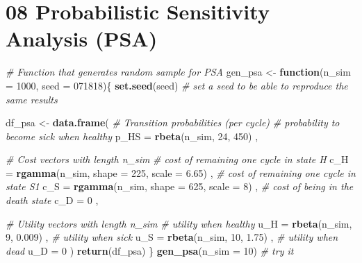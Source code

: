 \documentclass[
]{article}
\newenvironment{Shaded}{\begin{snugshade}}{\end{snugshade}}
\newcommand{\CommentTok}[1]{\textcolor[rgb]{0.56,0.35,0.01}{\textit{#1}}}
\newcommand{\ControlFlowTok}[1]{\textcolor[rgb]{0.13,0.29,0.53}{\textbf{#1}}}
\newcommand{\DataTypeTok}[1]{\textcolor[rgb]{0.13,0.29,0.53}{#1}}
\newcommand{\DecValTok}[1]{\textcolor[rgb]{0.00,0.00,0.81}{#1}}
\newcommand{\FloatTok}[1]{\textcolor[rgb]{0.00,0.00,0.81}{#1}}
\newcommand{\KeywordTok}[1]{\textcolor[rgb]{0.13,0.29,0.53}{\textbf{#1}}}
\newcommand{\NormalTok}[1]{#1}
\newcommand{\StringTok}[1]{\textcolor[rgb]{0.31,0.60,0.02}{#1}}
\begin{document}
\hypertarget{probabilistic-sensitivity-analysis-psa}{%
\section{08 Probabilistic Sensitivity Analysis
(PSA)}\label{probabilistic-sensitivity-analysis-psa}}

\begin{Shaded}
\begin{Highlighting}[]
\CommentTok{# Function that generates random sample for PSA}
\NormalTok{gen_psa <-}\StringTok{ }\ControlFlowTok{function}\NormalTok{(}\DataTypeTok{n_sim =} \DecValTok{1000}\NormalTok{, }\DataTypeTok{seed =} \DecValTok{071818}\NormalTok{)\{}
  \KeywordTok{set.seed}\NormalTok{(seed) }\CommentTok{# set a seed to be able to reproduce the same results}
  
\NormalTok{  df_psa <-}\StringTok{ }\KeywordTok{data.frame}\NormalTok{(}
    \CommentTok{# Transition probabilities (per cycle)}
    \CommentTok{# probability to become sick when healthy}
    \DataTypeTok{p_HS    =} \KeywordTok{rbeta}\NormalTok{(n_sim, }\DecValTok{24}\NormalTok{, }\DecValTok{450}\NormalTok{)                        , }
    
    \CommentTok{# Cost vectors with length n_sim}
    \CommentTok{# cost of remaining one cycle in state H}
    \DataTypeTok{c_H     =} \KeywordTok{rgamma}\NormalTok{(n_sim, }\DataTypeTok{shape =} \DecValTok{225}\NormalTok{, }\DataTypeTok{scale =} \FloatTok{6.65}\NormalTok{)     , }
    \CommentTok{# cost of remaining one cycle in state S1}
    \DataTypeTok{c_S     =} \KeywordTok{rgamma}\NormalTok{(n_sim, }\DataTypeTok{shape =} \DecValTok{625}\NormalTok{, }\DataTypeTok{scale =} \DecValTok{8}\NormalTok{)        , }
    \CommentTok{# cost of being in the death state}
    \DataTypeTok{c_D     =} \DecValTok{0}\NormalTok{                                            , }
    
    \CommentTok{# Utility vectors with length n_sim }
    \CommentTok{# utility when healthy}
    \DataTypeTok{u_H     =} \KeywordTok{rbeta}\NormalTok{(n_sim, }\DecValTok{9}\NormalTok{, }\FloatTok{0.009}\NormalTok{)                       , }
    \CommentTok{# utility when sick}
    \DataTypeTok{u_S     =} \KeywordTok{rbeta}\NormalTok{(n_sim, }\DecValTok{10}\NormalTok{, }\FloatTok{1.75}\NormalTok{)                       , }
    \CommentTok{# utility when dead}
    \DataTypeTok{u_D     =} \DecValTok{0}                                              
\NormalTok{  )}
  \KeywordTok{return}\NormalTok{(df_psa)}
\NormalTok{\}}
\KeywordTok{gen_psa}\NormalTok{(}\DataTypeTok{n_sim =} \DecValTok{10}\NormalTok{) }\CommentTok{# try it}


\end{Highlighting}
\end{Shaded}
\end{document}
